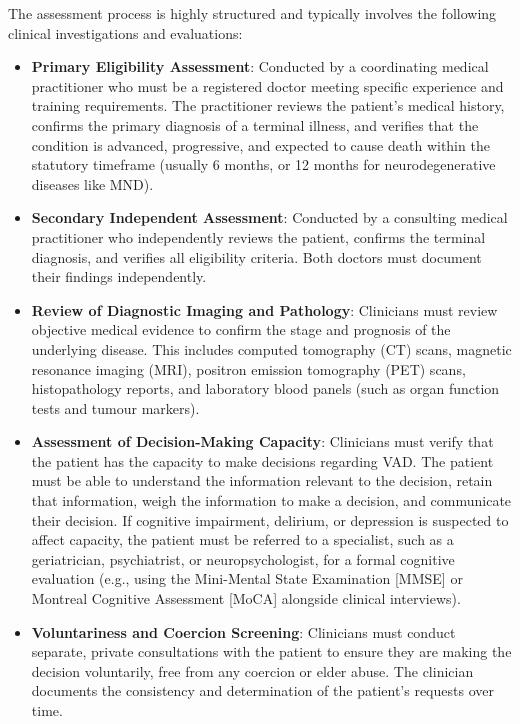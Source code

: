 The assessment process is highly structured and typically involves the following clinical investigations and evaluations:
\begin{itemize}
    \item \textbf{Primary Eligibility Assessment}: Conducted by a coordinating medical practitioner who must be a registered doctor meeting specific experience and training requirements. The practitioner reviews the patient's medical history, confirms the primary diagnosis of a terminal illness, and verifies that the condition is advanced, progressive, and expected to cause death within the statutory timeframe (usually 6 months, or 12 months for neurodegenerative diseases like MND).
    \item \textbf{Secondary Independent Assessment}: Conducted by a consulting medical practitioner who independently reviews the patient, confirms the terminal diagnosis, and verifies all eligibility criteria. Both doctors must document their findings independently.
    \item \textbf{Review of Diagnostic Imaging and Pathology}: Clinicians must review objective medical evidence to confirm the stage and prognosis of the underlying disease. This includes computed tomography (CT) scans, magnetic resonance imaging (MRI), positron emission tomography (PET) scans, histopathology reports, and laboratory blood panels (such as organ function tests and tumour markers).
    \item \textbf{Assessment of Decision-Making Capacity}: Clinicians must verify that the patient has the capacity to make decisions regarding VAD. The patient must be able to understand the information relevant to the decision, retain that information, weigh the information to make a decision, and communicate their decision. If cognitive impairment, delirium, or depression is suspected to affect capacity, the patient must be referred to a specialist, such as a geriatrician, psychiatrist, or neuropsychologist, for a formal cognitive evaluation (e.g., using the Mini-Mental State Examination [MMSE] or Montreal Cognitive Assessment [MoCA] alongside clinical interviews).
    \item \textbf{Voluntariness and Coercion Screening}: Clinicians must conduct separate, private consultations with the patient to ensure they are making the decision voluntarily, free from any coercion or elder abuse. The clinician documents the consistency and determination of the patient's requests over time.
\end{itemize}

